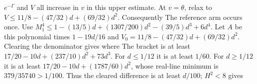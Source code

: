 $e^{-\Gamma}$ and $V$ all increase in $v$ in this upper estimate.
At $v=\allowbreak \theta$, relax to
$V\le\allowbreak 11/8-(47/32)d+(69/32)d^2$. Consequently
The reference arm occurs once. Use
$M_1^4\le\allowbreak 1-(13/5)d+(1307/200)d^2-(39/5)d^3+6d^4$.
Let $A$ be this polynomial times $1-19d/16$ and
$V_0=\allowbreak 11/8-(47/32)d+(69/32)d^2$. Clearing the denominator gives
where
The bracket is at least $17/20-10d+(237/10)d^2+73d^3$.
For $d\le\allowbreak 1/12$ it is at least $1/60$.
For $d\ge\allowbreak 1/12$ it is at least
$17/20-10d+(1787/60)d^2$, whose real-line minimum is
$379/35740>\allowbreak 1/100$. Thus the cleared difference is at least $d/100$;
$H^2<\allowbreak 8$ gives

